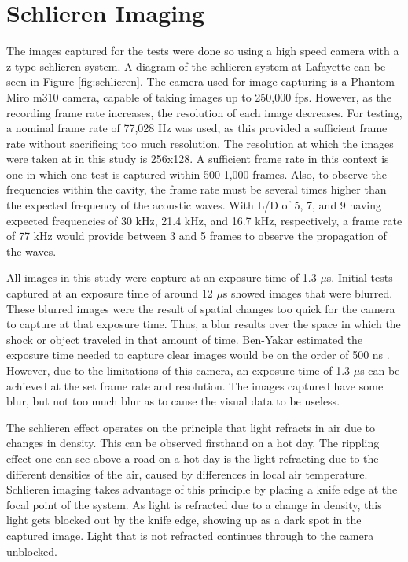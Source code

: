 \section{Schlieren Imaging}

The images captured for the tests were done so using a high speed camera with a z-type schlieren system. A diagram of the schlieren system at Lafayette can be seen in Figure \ref{fig:schlieren}. The camera used for image capturing is a Phantom Miro m310 camera, capable of taking images up to 250,000 fps. However, as the recording frame rate increases, the resolution of each image decreases. For testing, a nominal frame rate of 77,028 Hz was used, as this provided a sufficient frame rate without sacrificing too much resolution. The resolution at which the images were taken at in this study is 256x128. A sufficient frame rate in this context is one in which one test is captured within 500-1,000 frames. Also, to observe the frequencies within the cavity, the frame rate must be several times higher than the expected frequency of the acoustic waves. With L/D of 5, 7, and 9 having expected frequencies of 30 kHz, 21.4 kHz, and 16.7 kHz, respectively, a frame rate of 77 kHz would provide between 3 and 5 frames to observe the propagation of the waves.

All images in this study were capture at an exposure time of 1.3 $\mu$s. Initial tests captured at an exposure time of around 12 $\mu$s showed images that were blurred. These blurred images were the result of spatial changes too quick for the camera to capture at that exposure time. Thus, a blur results over the space in which the shock or object traveled in that amount of time. Ben-Yakar estimated the exposure time needed to capture clear images would be on the order of 500 ns \cite{ben2000experimental}. However, due to the limitations of this camera, an exposure time of 1.3 $\mu$s can be achieved at the set frame rate and resolution. The images captured have some blur, but not too much blur as to cause the visual data to be useless. 

The schlieren effect operates on the principle that light refracts in air due to changes in density. This can be observed firsthand on a hot day. The rippling effect one can see above a road on a hot day is the light refracting due to the different densities of the air, caused by differences in local air temperature. Schlieren imaging takes advantage of this principle by placing a knife edge at the focal point of the system. As light is refracted due to a change in density, this light gets blocked out by the knife edge, showing up as a dark spot in the captured image. Light that is not refracted continues through to the camera unblocked. 

